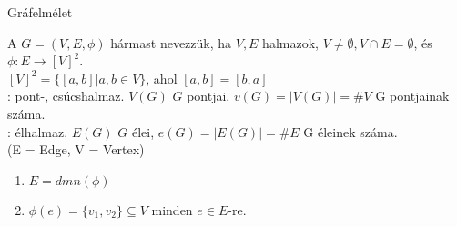 
\begin{frame}[plain]
\begin{tcolorbox}[center, colback={myyellow}, coltext={black}, colframe={myyellow}]
    {\RHuge Gráfelmélet}
\end{tcolorbox}
\end{frame}


\begin{frame}

\begin{tcolorbox}[title={Gráf}]
A $G = (V, E, {\phi})$ hármast  nevezzük, ha $V, E$ halmazok, $V \neq \emptyset, V \cap E = \emptyset$, és $\phi : E \rightarrow [V]^2$.\\
\mbigskip
$[V]^2 = \{ [a, b] | a, b \in V \}$, ahol $[a, b] = [b, a]$\\
\mbigskip
{}: pont-, csúcshalmaz. $V(G)$ $G$ pontjai, $v(G) = |V(G)| = \#V$ G pontjainak száma.\\
\mbigskip
{}: élhalmaz. $E(G)$ $G$ élei, $e(G) = |E(G)| = \#E$ G éleinek száma.\\
\mbigskip
(E = Edge, V = Vertex)
\end{tcolorbox}

\begin{tcolorbox}[title={Ész}]
\begin{enumerate}
\item $E = dmn({\phi})$
\item ${\phi}(e) = \{v_1, v_2\} \subseteq V$ minden $e \in E$-re.
\end{enumerate}
\end{tcolorbox}

\end{frame}


